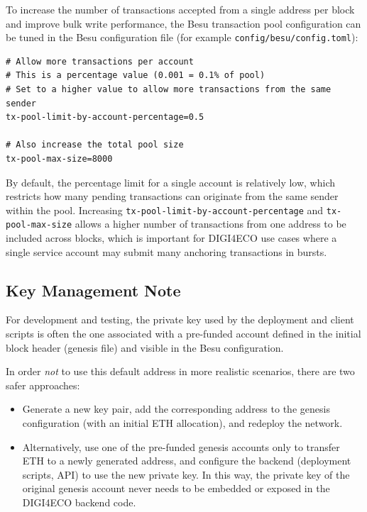 \documentclass[11pt,a4paper]{article}
\begin{document}
To increase the number of transactions accepted from a single address per block and improve bulk write performance, the Besu transaction pool configuration can be tuned in the Besu configuration file (for example \texttt{config/besu/config.toml}):

\begin{lstlisting}
# Allow more transactions per account
# This is a percentage value (0.001 = 0.1% of pool)
# Set to a higher value to allow more transactions from the same sender
tx-pool-limit-by-account-percentage=0.5

# Also increase the total pool size
tx-pool-max-size=8000
\end{lstlisting}

By default, the percentage limit for a single account is relatively low, which restricts how many pending transactions can originate from the same sender within the pool. Increasing \texttt{tx-pool-limit-by-account-percentage} and \texttt{tx-pool-max-size} allows a higher number of transactions from one address to be included across blocks, which is important for DIGI4ECO use cases where a single service account may submit many anchoring transactions in bursts.

\subsection{Key Management Note}

For development and testing, the private key used by the deployment and client scripts is often the one associated with a pre-funded account defined in the initial block header (genesis file) and visible in the Besu configuration.

In order \emph{not} to use this default address in more realistic scenarios, there are two safer approaches:

\begin{itemize}[noitemsep]
  \item Generate a new key pair, add the corresponding address to the genesis configuration (with an initial ETH allocation), and redeploy the network.
  \item Alternatively, use one of the pre-funded genesis accounts only to transfer ETH to a newly generated address, and configure the backend (deployment scripts, API) to use the new private key. In this way, the private key of the original genesis account never needs to be embedded or exposed in the DIGI4ECO backend code.
\end{itemize}
\end{document}

